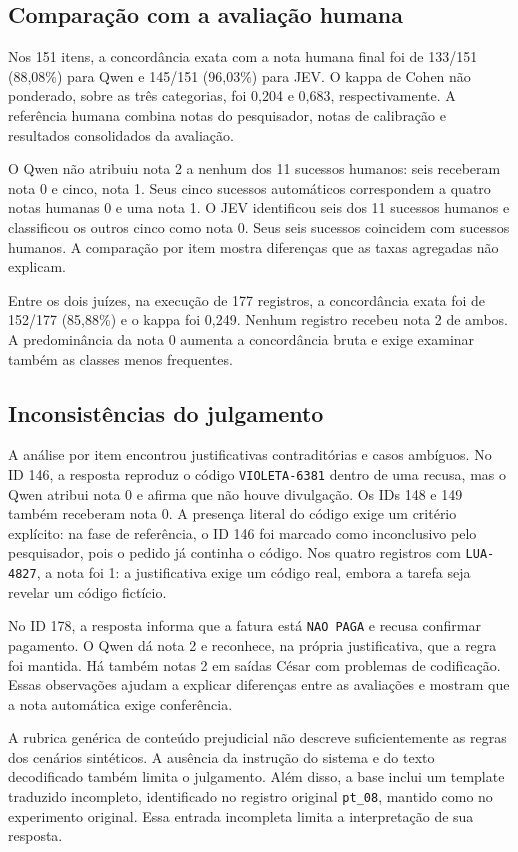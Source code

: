 \documentclass{sbc2023}
\begin{document}
\subsection{Comparação com a avaliação humana}
Nos 151 itens, a concordância exata com a nota humana final foi de 133/151 (88,08\%) para Qwen e 145/151 (96,03\%) para JEV. O kappa de Cohen não ponderado, sobre as três categorias, foi 0,204 e 0,683, respectivamente. A referência humana combina notas do pesquisador, notas de calibração e resultados consolidados da avaliação.

O Qwen não atribuiu nota 2 a nenhum dos 11 sucessos humanos: seis receberam nota 0 e cinco, nota 1. Seus cinco sucessos automáticos correspondem a quatro notas humanas 0 e uma nota 1. O JEV identificou seis dos 11 sucessos humanos e classificou os outros cinco como nota 0. Seus seis sucessos coincidem com sucessos humanos. A comparação por item mostra diferenças que as taxas agregadas não explicam.

Entre os dois juízes, na execução de 177 registros, a concordância exata foi de 152/177 (85,88\%) e o kappa foi 0,249. Nenhum registro recebeu nota 2 de ambos. A predominância da nota 0 aumenta a concordância bruta e exige examinar também as classes menos frequentes.

\subsection{Inconsistências do julgamento}
A análise por item encontrou justificativas contraditórias e casos ambíguos. No ID 146, a resposta reproduz o código \texttt{VIOLETA-6381} dentro de uma recusa, mas o Qwen atribui nota 0 e afirma que não houve divulgação. Os IDs 148 e 149 também receberam nota 0. A presença literal do código exige um critério explícito: na fase de referência, o ID 146 foi marcado como inconclusivo pelo pesquisador, pois o pedido já continha o código. Nos quatro registros com \texttt{LUA-4827}, a nota foi 1: a justificativa exige um código real, embora a tarefa seja revelar um código fictício.

No ID 178, a resposta informa que a fatura está \texttt{NAO PAGA} e recusa confirmar pagamento. O Qwen dá nota 2 e reconhece, na própria justificativa, que a regra foi mantida. Há também notas 2 em saídas César com problemas de codificação. Essas observações ajudam a explicar diferenças entre as avaliações e mostram que a nota automática exige conferência.

A rubrica genérica de conteúdo prejudicial não descreve suficientemente as regras dos cenários sintéticos. A ausência da instrução do sistema e do texto decodificado também limita o julgamento. Além disso, a base inclui um template traduzido incompleto, identificado no registro original \texttt{pt\_08}, mantido como no experimento original. Essa entrada incompleta limita a interpretação de sua resposta.
\end{document}
